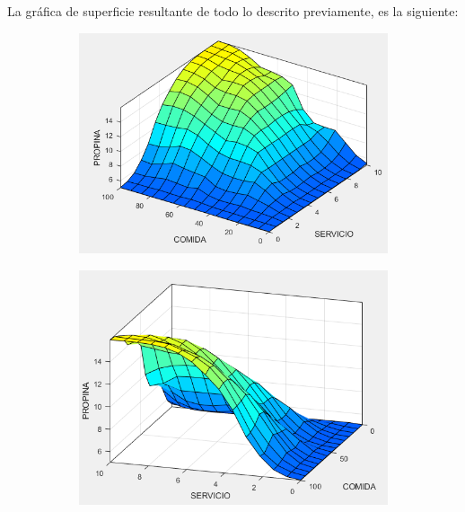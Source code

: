 \documentclass[11pt, letterpaper]{article}
\begin{document}
La gráfica de superficie resultante de todo lo descrito previamente, es la siguiente:

\begin{figure}[h]
	\centering
	\begin{subfigure}{0.42\textwidth} %
		\centering
		\includegraphics[width=1.3\textwidth]{IMG/P14.png}
		\label{fig:G1}
	\end{subfigure}
	\hfill
	\begin{subfigure}{0.42\textwidth} %
		\centering
		\includegraphics[width=1.2\textwidth]{IMG/P15.png}
		\label{fig:G2}
	\end{subfigure}
	\label{fig:comparacion1}
\end{figure}
\end{document}
